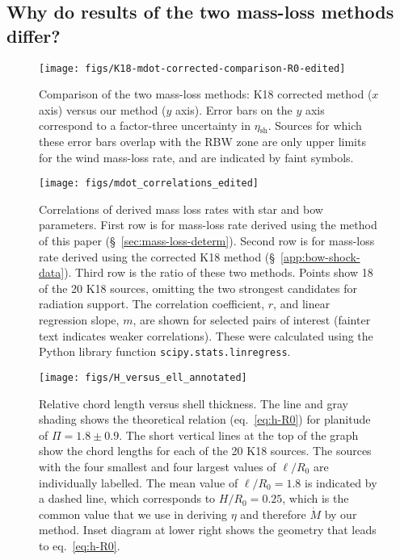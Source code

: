 \documentclass[useAMS, usenatbib, a4paper]{mnras}
\newcommand\shell{\ensuremath{_{\text{sh}}}}
\begin{document}
\subsection{Why do results of the two mass-loss methods differ?}
\label{sec:underst-diff-betw}

\begin{figure}
  \centering
  \texttt{[image: figs/K18-mdot-corrected-comparison-R0-edited]}
  \caption{Comparison of the two mass-loss methods: K18 corrected
    method (\(x\) axis) versus our method (\(y\) axis).  Error bars on
    the \(y\) axis correspond to a factor-three uncertainty in
    \(\eta\shell\).  Sources for which these error bars overlap with
    the RBW zone are only upper limits for the wind mass-loss rate,
    and are indicated by faint symbols.}
  \label{fig:mass-loss-comparison}
\end{figure}

\begin{figure*}
  \centering
  \texttt{[image: figs/mdot\_correlations\_edited]}
  \caption{Correlations of derived mass loss rates with star and bow
    parameters. First row is for mass-loss rate derived using the
    method of this paper (\S~\ref{sec:mass-loss-determ}).  Second row
    is for mass-loss rate derived using the corrected K18 method
    (\S~\ref{app:bow-shock-data}).  Third row is the ratio of these
    two methods.  Points show 18 of the 20 K18 sources, omitting the
    two strongest candidates for radiation support.  The correlation
    coefficient, \(r\), and linear regression slope, \(m\), are shown
    for selected pairs of interest (fainter text indicates weaker
    correlations).  These were calculated using the Python library
    function \texttt{scipy.stats.linregress}.}
  \label{fig:correlations}
\end{figure*}

\begin{figure}
  \centering
  \texttt{[image: figs/H\_versus\_ell\_annotated]}
  \caption{Relative chord length versus shell thickness.  The line and
    gray shading shows the theoretical relation (eq.~\eqref{eq:h-R0})
    for planitude of \(\Pi = 1.8 \pm 0.9\).  The short vertical lines
    at the top of the graph show the chord lengths for each of the 20
    K18 sources.  The sources with the four smallest and four largest
    values of \(\ell/R_0\) are individually labelled. The mean value
    of \(\ell / R_0 = 1.8\) is indicated by a dashed line, which
    corresponds to \(H/R_0 = 0.25\), which is the common value that we
    use in deriving \(\eta\) and therefore \(\dot{M}\) by our method.
    Inset diagram at lower right shows the geometry that leads to
    eq.~\eqref{eq:h-R0}.  }
  \label{fig:H-versus-ell}
\end{figure}
\end{document}
